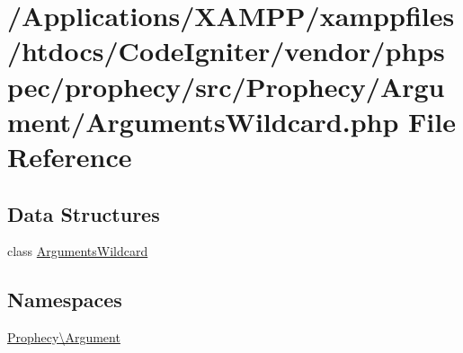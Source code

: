 \hypertarget{_arguments_wildcard_8php}{}\section{/\+Applications/\+X\+A\+M\+P\+P/xamppfiles/htdocs/\+Code\+Igniter/vendor/phpspec/prophecy/src/\+Prophecy/\+Argument/\+Arguments\+Wildcard.php File Reference}
\label{_arguments_wildcard_8php}
\subsection*{Data Structures}
\begin{DoxyCompactItemize}
\item 
class \mbox{\hyperlink{class_prophecy_1_1_argument_1_1_arguments_wildcard}{Arguments\+Wildcard}}
\end{DoxyCompactItemize}
\subsection*{Namespaces}
\begin{DoxyCompactItemize}
\item 
 \mbox{\hyperlink{namespace_prophecy_1_1_argument}{Prophecy\textbackslash{}\+Argument}}
\end{DoxyCompactItemize}
